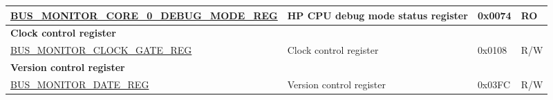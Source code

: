 \begin{longtable}{ |p{9.5cm} | p{11.6cm}| l | l | }
\hyperref[regdesc:BUSMONITORCORE0DEBUGMODEREG]{BUS\_MONITOR\_CORE\_0\_DEBUG\_MODE\_REG} & HP CPU debug mode status register & 0x0074 & RO \\ \hline
\multicolumn{4}{|l|}{\textbf{Clock control register}} \\ \hline
\hyperref[regdesc:BUSMONITORCLOCKGATEREG]{BUS\_MONITOR\_CLOCK\_GATE\_REG} & Clock control register & 0x0108 & R/W \\ \hline
\multicolumn{4}{|l|}{\textbf{Version control register}} \\ \hline
\hyperref[regdesc:BUSMONITORDATEREG]{BUS\_MONITOR\_DATE\_REG} & Version control register & 0x03FC & R/W \\ \hline
\end{longtable}

